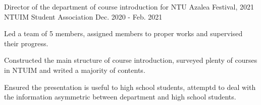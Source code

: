 

\begin{cventries}

  \cventry
    {Director of the department of course introduction for NTU Azalea Festival, 2021} %
    {NTUIM Student Association} %
    {} %
    {Dec. 2020 - Feb. 2021} %
    {
      \begin{cvitems} %
        \item {Led a team of 5 members, assigned members to proper works and
            supervised their progress.}
        \item {Constructed the main structure of course introduction,
            surveyed plenty of courses in NTUIM and writed a majority of contents.}
        \item {Ensured the presentation is useful to high school students, 
            attemptd to deal with the information asymmetric between department 
            and high school students.}
      \end{cvitems}
    }

\end{cventries}
